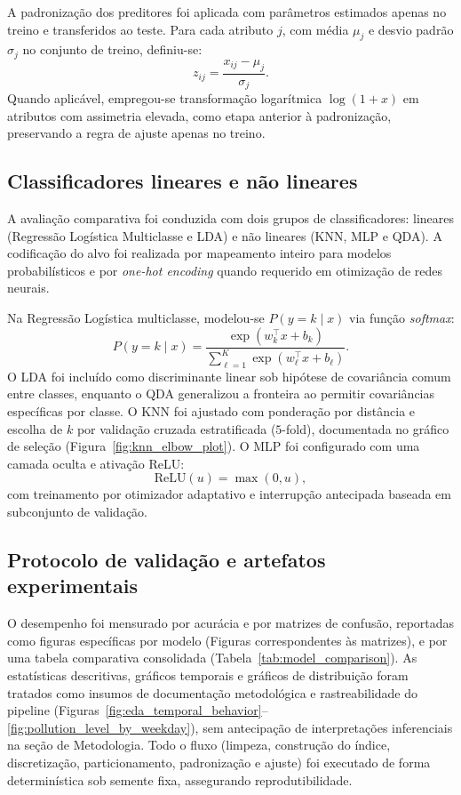 A padronização dos preditores foi aplicada com parâmetros estimados apenas no treino e transferidos ao teste. Para cada atributo \(j\), com média \(\mu_j\) e desvio padrão \(\sigma_j\) no conjunto de treino, definiu-se:
\begin{equation}
z_{ij}=\frac{x_{ij}-\mu_j}{\sigma_j}.
\label{eq:zscore}
\end{equation}
Quando aplicável, empregou-se transformação logarítmica \(\log(1+x)\) em atributos com assimetria elevada, como etapa anterior à padronização, preservando a regra de ajuste apenas no treino.

\subsection{Classificadores lineares e não lineares}
\label{subsec:modelos}

A avaliação comparativa foi conduzida com dois grupos de classificadores: lineares (Regressão Logística Multiclasse e LDA) e não lineares (KNN, MLP e QDA). A codificação do alvo foi realizada por mapeamento inteiro para modelos probabilísticos e por \textit{one-hot encoding} quando requerido em otimização de redes neurais.

Na Regressão Logística multiclasse, modelou-se \(P(y=k\mid x)\) via função \textit{softmax}:
\begin{equation}
P(y=k\mid x)=\frac{\exp\left(w_k^\top x+b_k\right)}{\sum_{\ell=1}^{K}\exp\left(w_\ell^\top x+b_\ell\right)}.
\label{eq:softmax}
\end{equation}
O LDA foi incluído como discriminante linear sob hipótese de covariância comum entre classes, enquanto o QDA generalizou a fronteira ao permitir covariâncias específicas por classe. O KNN foi ajustado com ponderação por distância e escolha de \(k\) por validação cruzada estratificada (\(5\)-fold), documentada no gráfico de seleção (Figura~\ref{fig:knn_elbow_plot}). O MLP foi configurado com uma camada oculta e ativação ReLU:
\begin{equation}
\mathrm{ReLU}(u)=\max(0,u),
\label{eq:relu}
\end{equation}
com treinamento por otimizador adaptativo e interrupção antecipada baseada em subconjunto de validação.

\subsection{Protocolo de validação e artefatos experimentais}
\label{subsec:validacao}

O desempenho foi mensurado por acurácia e por matrizes de confusão, reportadas como figuras específicas por modelo (Figuras correspondentes às matrizes), e por uma tabela comparativa consolidada (Tabela~\ref{tab:model_comparison}). As estatísticas descritivas, gráficos temporais e gráficos de distribuição foram tratados como insumos de documentação metodológica e rastreabilidade do pipeline (Figuras~\ref{fig:eda_temporal_behavior}--\ref{fig:pollution_level_by_weekday}), sem antecipação de interpretações inferenciais na seção de Metodologia. Todo o fluxo (limpeza, construção do índice, discretização, particionamento, padronização e ajuste) foi executado de forma determinística sob semente fixa, assegurando reprodutibilidade.
